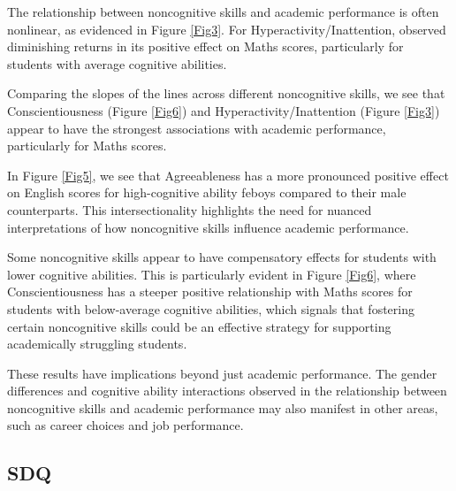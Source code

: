 \documentclass[12pt,a4paper,onecolumn]{article}
\numberwithin{equation}{section}
\begin{document}
The relationship between noncognitive skills and academic performance is often nonlinear, as evidenced in Figure \ref{Fig3}. For Hyperactivity/Inattention, observed diminishing returns in its positive effect on Maths scores, particularly for students with average cognitive abilities. 

Comparing the slopes of the lines across different noncognitive skills, we see that Conscientiousness (Figure \ref{Fig6}) and Hyperactivity/Inattention (Figure \ref{Fig3}) appear to have the strongest associations with academic performance, particularly for Maths scores. 

In Figure \ref{Fig5}, we see that Agreeableness has a more pronounced positive effect on English scores for high-cognitive ability feboys compared to their male counterparts. This intersectionality highlights the need for nuanced interpretations of how noncognitive skills influence academic performance.

Some noncognitive skills appear to have compensatory effects for students with lower cognitive abilities. This is particularly evident in Figure \ref{Fig6}, where Conscientiousness has a steeper positive relationship with Maths scores for students with below-average cognitive abilities, which signals that fostering certain noncognitive skills could be an effective strategy for supporting academically struggling students.

These results have implications beyond just academic performance. The gender differences and cognitive ability interactions observed in the relationship between noncognitive skills and academic performance may also manifest in other areas, such as career choices and job performance. 

\subsection{SDQ}
\end{document}
